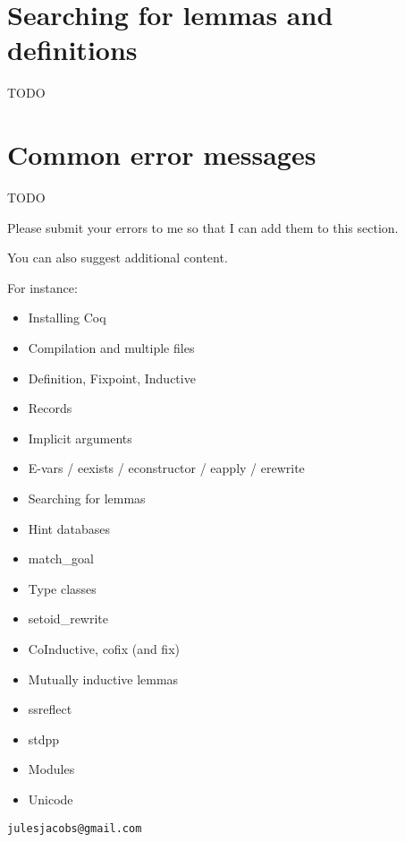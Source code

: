 \section{Searching for lemmas and definitions}

TODO

\section{Common error messages}

TODO

Please submit your errors to me so that I can add them to this section.

You can also suggest additional content.

For instance:

\begin{itemize}
  \item Installing Coq
  \item Compilation and multiple files
  \item Definition, Fixpoint, Inductive
  \item Records
  \item Implicit arguments
  \item E-vars / eexists / econstructor / eapply / erewrite
  \item Searching for lemmas
  \item Hint databases
  \item match\_goal
  \item Type classes
  \item setoid\_rewrite
  \item CoInductive, cofix (and fix)
  \item Mutually inductive lemmas
  \item ssreflect
  \item stdpp
  \item Modules
  \item Unicode
\end{itemize}

\texttt{julesjacobs@gmail.com}




